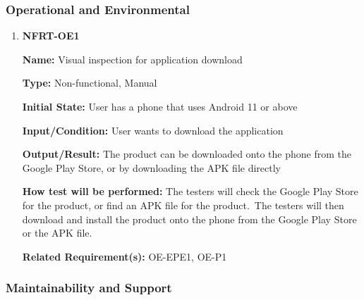 \documentclass[12pt, titlepage]{article}
\begin{document}
\subsubsection{Operational and Environmental}

\begin{enumerate}
\item{\textbf{NFRT-OE1}}

\textbf{Name:} Visual inspection for application download

\textbf{Type:} Non-functional, Manual

\textbf{Initial State:} User has a phone that uses Android 11 or above

\textbf{Input/Condition:} User wants to download the application

\textbf{Output/Result:} The product can be downloaded onto the phone from the Google Play Store, or by downloading the APK file directly

\textbf{How test will be performed:} The testers will check the Google Play Store for the product, or find an APK file for the product.\
The testers will then download and install the product onto the phone from the Google Play Store or the APK file.

\textbf{Related Requirement(s):} OE-EPE1, OE-P1
\end{enumerate}

\subsubsection{Maintainability and Support}
\end{document}
